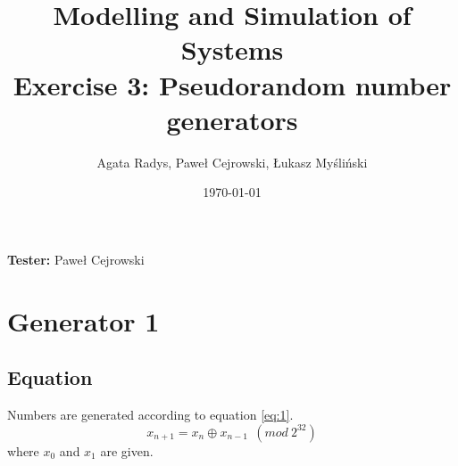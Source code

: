 \documentclass[a4paper,10pt]{article}
\title{Modelling and Simulation of Systems\\ \Large
Exercise 3: Pseudorandom number generators}
\author{Agata Radys, Paweł Cejrowski, Łukasz Myśliński}
\date{\today}
\begin{document}
\maketitle
\textbf{Tester:} Paweł Cejrowski



\section{Generator 1}

\subsection{Equation}
Numbers are generated according to equation \ref{eq:1}.
\begin{equation}
\label{eq:1}
  x_{n+1} = x_n \oplus x_{n-1}\ \ (mod\ 2^{32})
\end{equation}
where ${x_0}$ and ${x_1}$ are given.
\end{document}
